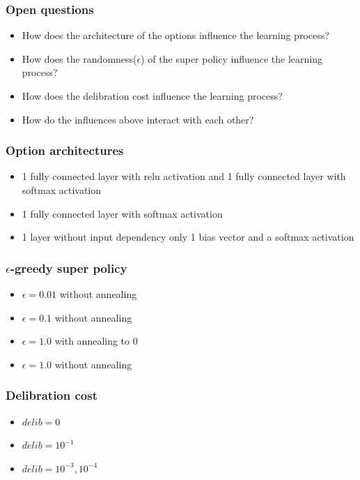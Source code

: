 \documentclass{beamer}
\begin{document}
\begin{frame}
\frametitle{Open questions}
\begin{itemize}
\item How does the architecture of the options influence the learning process? \pause
\item How does the randomness($\epsilon$) of the super policy influence the learning process? \pause
\item How does the delibration cost influence the learning process? \pause
\item How do the influences above interact with each other?
\end{itemize}
\end{frame}


\begin{frame}
\frametitle{Option architectures}
\begin{itemize}
\item 1 fully connected layer with relu activation and 1 fully connected layer with softmax activation \pause
\item 1 fully connected layer with softmax activation \pause
\item 1 layer without input dependency only 1 bias vector and a softmax activation
\end{itemize}

\end{frame}

\begin{frame}
\frametitle{$\epsilon$-greedy super policy}
\begin{itemize}
\item $\epsilon=0.01$ without annealing \pause
\item $\epsilon=0.1$ without annealing \pause
\item $\epsilon=1.0$ with annealing to $0$ \pause
\item $\epsilon=1.0$ without annealing 
\end{itemize}
\end{frame}

\begin{frame}
\frametitle{Delibration cost}
\begin{itemize}
\item $delib = 0$ \pause
\item $delib = 10^{-1} $ \pause
\item $delib = 10^{-3},10^{-4} $
\end{itemize}

\end{frame}
\end{document}
